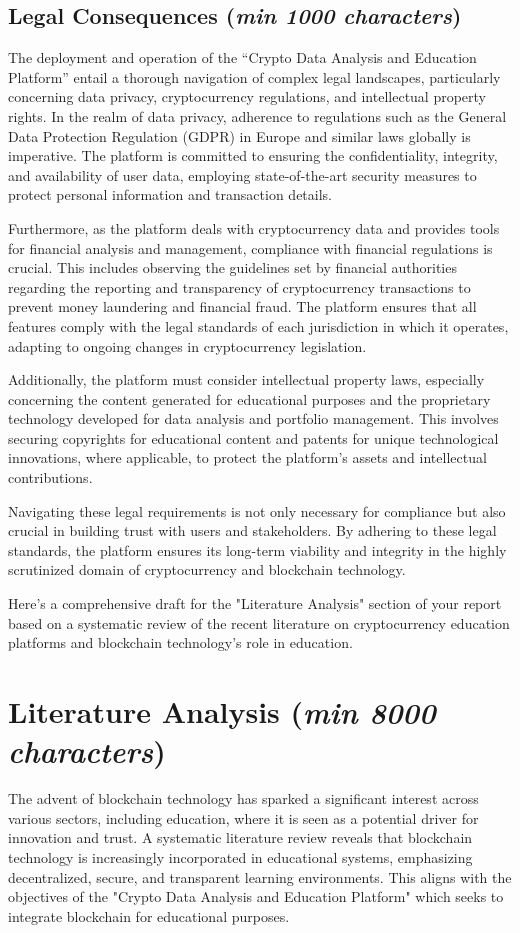 \documentclass[12pt]{report}
\newcommand{\characters}[1]{(\textit{min #1 characters})}
\begin{document}
\subsection{Legal Consequences \characters{1000}}
The deployment and operation of the ``Crypto Data Analysis and Education Platform'' entail a thorough navigation of complex legal landscapes, particularly concerning data privacy, cryptocurrency regulations, and intellectual property rights. In the realm of data privacy, adherence to regulations such as the General Data Protection Regulation (GDPR) in Europe and similar laws globally is imperative. The platform is committed to ensuring the confidentiality, integrity, and availability of user data, employing state-of-the-art security measures to protect personal information and transaction details.

Furthermore, as the platform deals with cryptocurrency data and provides tools for financial analysis and management, compliance with financial regulations is crucial. This includes observing the guidelines set by financial authorities regarding the reporting and transparency of cryptocurrency transactions to prevent money laundering and financial fraud. The platform ensures that all features comply with the legal standards of each jurisdiction in which it operates, adapting to ongoing changes in cryptocurrency legislation.

Additionally, the platform must consider intellectual property laws, especially concerning the content generated for educational purposes and the proprietary technology developed for data analysis and portfolio management. This involves securing copyrights for educational content and patents for unique technological innovations, where applicable, to protect the platform’s assets and intellectual contributions.

Navigating these legal requirements is not only necessary for compliance but also crucial in building trust with users and stakeholders. By adhering to these legal standards, the platform ensures its long-term viability and integrity in the highly scrutinized domain of cryptocurrency and blockchain technology.



Here's a comprehensive draft for the "Literature Analysis" section of your report based on a systematic review of the recent literature on cryptocurrency education platforms and blockchain technology's role in education.

\section{Literature Analysis \characters{8000}}
The advent of blockchain technology has sparked a significant interest across various sectors, including education, where it is seen as a potential driver for innovation and trust. A systematic literature review reveals that blockchain technology is increasingly incorporated in educational systems, emphasizing decentralized, secure, and transparent learning environments. This aligns with the objectives of the "Crypto Data Analysis and Education Platform" which seeks to integrate blockchain for educational purposes.
\end{document}
